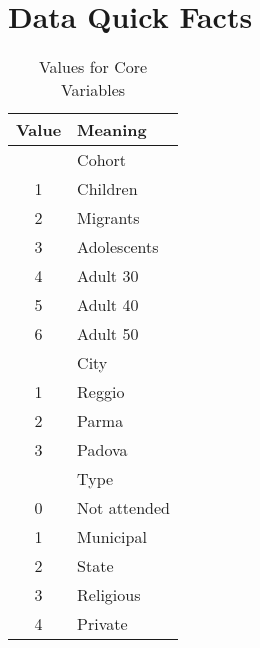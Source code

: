 \documentclass{article}
\begin{document}
\begin{enumerate}
\end{enumerate}

\section{Data Quick Facts}

\begin{table}[htbp]
\begin{center}
\caption{Values for Core Variables}
\begin{tabular}{cl}
\toprule
Value & Meaning \\
\midrule
& Cohort \\
\midrule
1 & Children \\
2 & Migrants \\
3 & Adolescents \\
4 & Adult 30 \\
5 & Adult 40 \\
6 & Adult 50 \\
\midrule
& City \\
\midrule
1 & Reggio \\
2 & Parma \\
3 & Padova \\
\midrule
& Type \\
\midrule
0 & Not attended \\
1 & Municipal \\
2 & State \\
3 & Religious \\
4 & Private \\
\bottomrule
\end{tabular}
\end{center}
\end{table}
\end{document}
